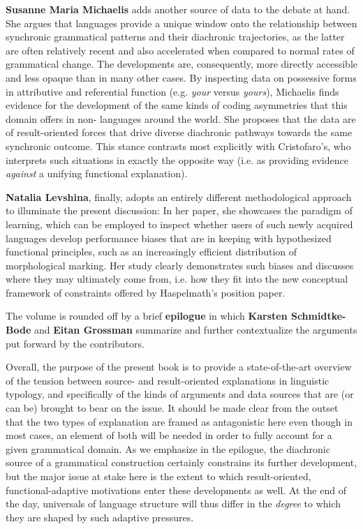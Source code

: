 \documentclass[output=paper]{langsci/langscibook}
\begin{document}
\textbf{Susanne Maria Michaelis} adds another source of data to the debate at hand. She argues that  languages provide a unique window onto the relationship between synchronic grammatical patterns and their diachronic trajectories, as the latter are often relatively recent and also accelerated when compared to normal rates of grammatical change. The developments are, consequently, more directly accessible and less opaque than in many other cases. By inspecting  data on possessive forms in attributive and referential function (e.g. \textit{your} versus \textit{yours}), Michaelis finds evidence for the development of the same kinds of coding asymmetries that this domain offers in non- languages around the world. She proposes that the data are  of result-oriented forces that drive diverse diachronic pathways towards the same synchronic outcome. This stance contrasts most explicitly with Cristofaro’s, who interprets such situations in exactly the opposite way (i.e. as providing evidence \textit{against} a unifying functional explanation).

\textbf{Natalia Levshina}, finally, adopts an entirely different methodological approach to illuminate the present discussion: In her paper, she showcases the paradigm of  learning, which can be employed to inspect whether users of such newly acquired languages develop performance biases that are in keeping with hypothesized functional principles, such as an increasingly efficient distribution of morphological marking. Her  study clearly demonstrates such biases and discusses where they may ultimately come from, i.e. how they fit into the new conceptual framework of constraints offered by Haspelmath’s position paper.
\largerpage

The volume is rounded off by a brief \textbf{epilogue} in which \textbf{Karsten Schmidtke-Bode} and \textbf{Eitan Grossman} summarize and further contextualize the arguments put forward by the contributors. 

Overall, the purpose of the present book is to provide a state-of-the-art overview of the  tension between source- and result-oriented explanations in linguistic typology, and specifically of the kinds of arguments and data sources that are (or can be) brought to bear on the issue. It should be made clear from the outset that the two types of explanation are framed as antagonistic here even though in most cases, an element of both will be needed in order to fully account for a given grammatical domain. As we emphasize in the epilogue, the diachronic source of a grammatical construction certainly constrains its further development, but the major issue at stake here is the extent to which result-oriented, functional-adaptive motivations enter these developments as well. At the end of the day, universals of language structure will thus differ in the \textit{degree} to which they are shaped by such adaptive pressures.
\end{document}
